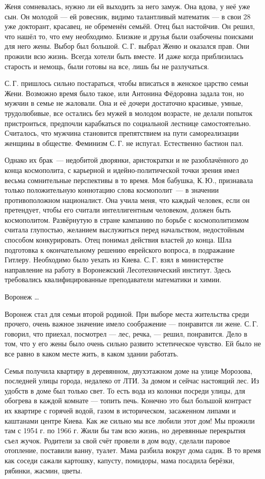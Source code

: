 Женя сомневалась, нужно ли ей выходить за него замуж. Она вдова, у неё уже сын. Он молодой --- ей ровесник, видимо талантливый математик --- в свои 28 уже докторант, красавец, не обременён семьёй. Отец был настойчив. Он решил, что нашёл то, что ему необходимо. Близкие и друзья были озабочены поисками для него жены. Выбор был большой. С.\,Г. выбрал Женю и оказался прав. Они прожили всю жизнь. Всегда хотели быть вместе. И даже когда приблизилась старость и немощь, были готовы на все, лишь бы не разлучаться.

С.\,Г. пришлось сильно постараться, чтобы вписаться в женское царство семьи Жени. Возможно время было такое, или Антонина Фёдоровна задала тон, но мужчин в семье не жаловали. Она и её дочери достаточно красивые, умные, трудолюбивые, все остались без мужей в молодом возрасте, не делали попыток пристроиться, предпочли карабкаться по социальной лестнице самостоятельно. Считалось, что мужчина становится препятствием на пути самореализации женщины в обществе. Феминизм С.\,Г. не испугал. Естественно бастион пал.

Однако их брак~--- недобитой дворянки, аристократки и не разоблачённого до конца космополита,
с карьерной и идейно-полити\-ческой точки зрения имел весьма сомнительные перспективы в то время.
Моя бабушка, К.\,Ю., признавала только положительную коннотацию слова космополит~--- в значении противоположном националист. Она учила меня, что каждый человек, если он претендует, чтобы его считали интеллигентным человеком, должен быть космополитом. Развёрнутую в стране кампанию по борьбе с космополитизмом считала глупостью, желанием выслужиться перед начальством, недостойным способом конкурировать. Отец понимал действия властей до конца. Шла подготовка к окончательному решению еврейского вопроса, в подражание \linebreak Гитлеру. Необходимо было уехать из Киева. С.\,Г. взял в министерстве направление на работу в Воронежский Лесотехнический институт. Здесь требовались квалифицированные преподаватели математики и химии.

Воронеж \ldots

Воронеж стал для семьи второй родиной. При выборе места жительства среди прочего, очень важное значение имело соображение --- понравится ли жене. С.\,Г. говорил, что приехал, посмотрел --- лес, речка, --- решил, понравится. Дело в том, что у его жены было очень сильно развито эстетическое чувство. Ей было не все равно в каком месте жить, в каком здании работать.

Семья получила квартиру в деревянном, двухэтажном доме на улице Морозова, последней улицы города, недалеко от ЛТИ. За домом и сейчас настоящий лес. Из удобств в доме был только свет. То есть вода из колонки посреди улицы, для обогрева в каждой комнате --- топить печь. Конечно это был большой контраст их квартире с горячей водой, газом в историческом, засаженном липами и каштанами центре Киева.
Как же сильно мы все любили этот дом! Мы прожили там с 1954 г. по 1966 г. Жили бы там всю жизнь, но деревянные перекрытия съел жучок. Родители за свой счёт провели в дом воду, сделали паровое отопление, поставили ванну, туалет. Мама разбила вокруг дома садик. В то время как соседи сажали картошку, капусту, помидоры, мама посадила берёзки, рябинки, жасмин, цветы.

